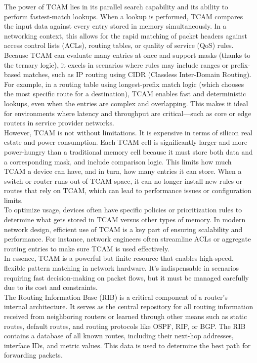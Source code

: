\documentclass[parindent=0pt]{article}
\begin{document}
The power of TCAM lies in its parallel search capability and its ability to perform fastest-match lookups. When a lookup is performed, TCAM compares the input data against every entry stored in memory simultaneously. In a networking context, this allows for the rapid matching of packet headers against access control lists (ACLs), routing tables, or quality of service (QoS) rules. Because TCAM can evaluate many entries at once and support masks (thanks to the ternary logic), it excels in scenarios where rules may include ranges or prefix-based matches, such as IP routing using CIDR (Classless Inter-Domain Routing).\\

For example, in a routing table using longest-prefix match logic (which chooses the most specific route for a destination), TCAM enables fast and deterministic lookups, even when the entries are complex and overlapping. This makes it ideal for environments where latency and throughput are critical—such as core or edge routers in service provider networks.\\

However, TCAM is not without limitations. It is expensive in terms of silicon real estate and power consumption. Each TCAM cell is significantly larger and more power-hungry than a traditional memory cell because it must store both data and a corresponding mask, and include comparison logic. This limits how much TCAM a device can have, and in turn, how many entries it can store. When a switch or router runs out of TCAM space, it can no longer install new rules or routes that rely on TCAM, which can lead to performance issues or configuration limits.\\

To optimize usage, devices often have specific policies or prioritization rules to determine what gets stored in TCAM versus other types of memory. In modern network design, efficient use of TCAM is a key part of ensuring scalability and performance. For instance, network engineers often streamline ACLs or aggregate routing entries to make sure TCAM is used effectively.\\

In essence, TCAM is a powerful but finite resource that enables high-speed, flexible pattern matching in network hardware. It’s indispensable in scenarios requiring fast decision-making on packet flows, but it must be managed carefully due to its cost and constraints.\\

The Routing Information Base (RIB) is a critical component of a router's internal architecture. It serves as the central repository for all routing information received from neighboring routers or learned through other means such as static routes, default routes, and routing protocols like OSPF, RIP, or BGP. The RIB contains a database of all known routes, including their next-hop addresses, interface IDs, and metric values. This data is used to determine the best path for forwarding packets.\\
\end{document}
